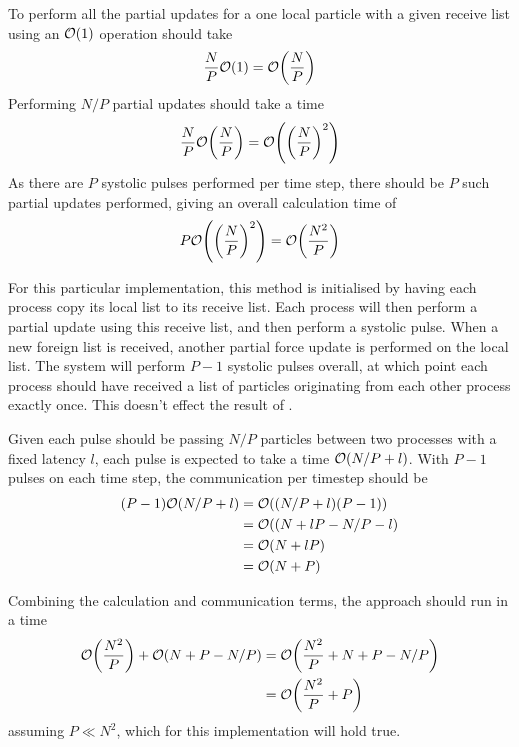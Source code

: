 %
To perform all the partial updates for a one local particle
with a given receive list using an $\mathcal{O}{\left({ 1 }\right)}$ operation should take
\begin{equation}
    \frac{N}{P}\mathcal{O}{\left({ 1 }\right)} = \mathcal{O}{\left({ \frac{N}{P} }\right)}
\end  {equation}
%
Performing $N/P$ partial updates should take a time
\begin{equation}
    \frac{N}{P}\mathcal{O}{\left({ \frac{N}{P} }\right)} = \mathcal{O}{\left({ \left( \frac{N}{P} \right)^2 }\right)}
\end  {equation}
%
As there are $P$ systolic pulses performed per time step,
there should be $P$ such partial updates
performed, giving an overall calculation time of
\begin{equation}
    \label{eqn:systolic_loop_pair_operation_overall_time}
    P\mathcal{O}{\left({  \left(\frac{N}{P}\right)^2  }\right)} = \mathcal{O}{\left({ \frac{N^2}{P} }\right)}
\end  {equation}


For this particular implementation,
this method is initialised by having each process
copy its local list to its receive list.
%
Each process will then perform a partial update using this receive
list, and then perform a systolic pulse.
%
When a new foreign list is received, another partial force update
is performed on the local list.
%
The system will perform $P-1$ systolic pulses overall, at which point
each process should have received a list of particles originating
from each other process exactly once.
%
This doesn't effect the result of
.


%
Given each pulse should be passing $N/P$ particles between two processes
with a fixed latency $l$, each pulse is expected to take a time
$\mathcal{O}{\left({ N/P + l }\right)}$.
%
With $P-1$ pulses on each time step, the communication per timestep should be
\begin{equation}
    \begin{split}
        (P-1)\mathcal{O}{\left({ N/P + l }\right)}
            &= \mathcal{O}{\left({ (N/P + l)(P-1) }\right)} \\
            &= \mathcal{O}{\left({ (N + lP - N/P - l }\right)} \\
            &= \mathcal{O}{\left({ N + lP }\right)} \\
            &= \mathcal{O}{\left({ N + P }\right)}
    \end{split}
\end{equation}

%
Combining the calculation and communication terms, the \systolicloop{} approach
should run in a time
\begin{equation}
    \begin{split}
        \mathcal{O}{\left({ \frac{N^2}{P} }\right)} + \mathcal{O}{\left({ N + P - N/P }\right)}
            &= \mathcal{O}{\left({ \frac{N^2}{P} + N + P - N/P }\right)} \\
            &= \mathcal{O}{\left({ \frac{N^2}{P} + P }\right)}
    \end{split}
\end{equation}
assuming $P \ll{} N^2$, which for this implementation will hold true.


